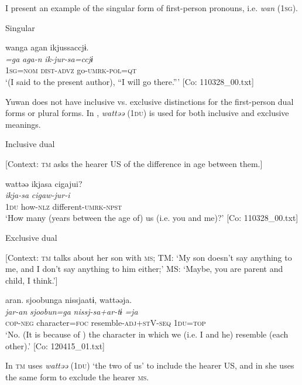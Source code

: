 I present an example of the singular form of first-person pronouns, i.e. \textit{wan} (1\textsc{sg}).

\ea \label{ex:5:2}   Singular

\glll  wanga  agan  ikjussaccjɨ.\\
\textit{=ga}  \textit{aga-n}  \textit{ik-jur-sa=ccjɨ}\\
1\textsc{sg}=\textsc{nom}  \textsc{dist}-\textsc{advz}  go-\textsc{umrk}-\textsc{pol}=\textsc{qt}\\
\glt ‘(I said to the present author), “I will go there.”’ [Co: 110328\_00.txt]
\z

Yuwan does not have inclusive vs. exclusive distinctions for the first-person dual forms or plural forms. In , \textit{wattəə} (1\textsc{du}) is used for both inclusive and exclusive meanings.

\ea \label{ex:5:3}  \ea \label{ex:5:3a} Inclusive dual

    [Context: \textsc{tm} asks the hearer US of the difference in age between them.]

\glll  wattəə  ikjasa  cigajui?\\
\textit{}  \textit{ikja-sa}  \textit{cigaw-jur-i}\\
1\textsc{du}  how-\textsc{nlz}  different-\textsc{umrk}-\textsc{npst}\\
\glt ‘How many (years between the age of) us (i.e. you and me)?’ [Co: 110328\_00.txt]

 \ex \label{ex:5:3b} Exclusive dual

    [Context: \textsc{tm} talks about her son with \textsc{ms}; TM: ‘My son doesn’t say anything to me, and I don’t say anything to him either;’ MS: ‘Maybe, you are parent and child, I think.’]

\glll  aran.  sjoobunga  nissjaatɨ,  wattəəja.\\
\textit{jar-an}  \textit{sjoobun=ga}  \textit{nissj-sa+ar-tɨ}  \textit{=ja}\\
\textsc{cop}-\textsc{neg}  character=\textsc{foc}  resemble-\textsc{adj}+\textsc{st}V-\textsc{seq}  1\textsc{du}=\textsc{top}\\
\glt ‘No. (It is because of ) the character in which we (i.e. I and he) resemble (each other).’ [Co: 120415\_01.txt]
\z
\z

\noindent In  \textsc{tm} uses \textit{wattəə} (1\textsc{du}) ‘the two of us’ to include the hearer US, and in  she uses the same form to exclude the hearer \textsc{ms}.

